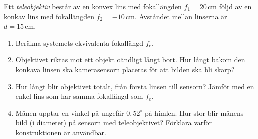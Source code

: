 Ett \emph{teleobjektiv} består av en konvex lins med fokallängden $f_1 = 20\,\mathrm{cm}$ följd av en konkav lins med fokallängden $f_2 = -10\,\mathrm{cm}$. Avståndet mellan linserna är $d = 15\,\mathrm{cm}$.
\begin{enumerate}
  \item Beräkna systemets ekvivalenta fokallängd $f_e$.
  \item Objektivet riktas mot ett objekt oändligt långt bort. Hur långt bakom den konkava linsen ska kamerasensorn placeras för att bilden ska bli skarp?
  \item Hur långt blir objektivet totalt, från första linsen till sensorn? Jämför med en enkel lins som har samma fokallängd som $f_e$.
  \item Månen upptar en vinkel på ungefär $0{,}52^\circ$ på himlen. Hur stor blir månens bild (i diameter) på sensorn med teleobjektivet? Förklara varför konstruktionen är användbar.
\end{enumerate}
